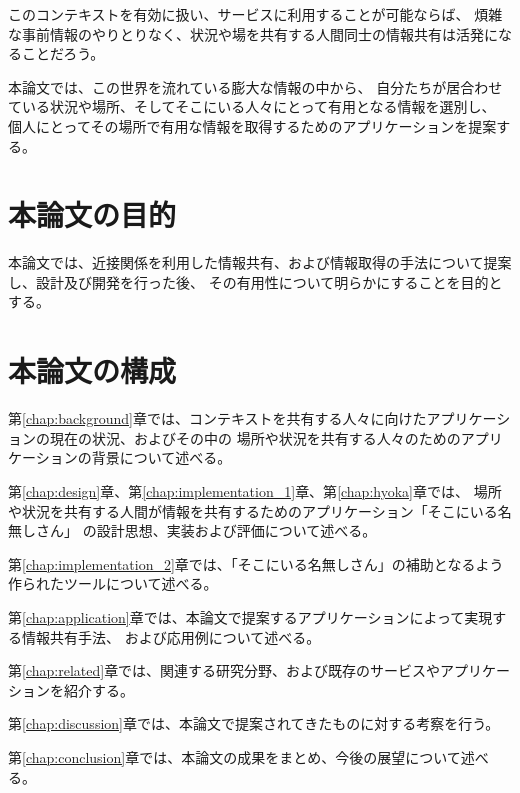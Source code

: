 このコンテキストを有効に扱い、サービスに利用することが可能ならば、
煩雑な事前情報のやりとりなく、状況や場を共有する人間同士の情報共有は活発になることだろう。

本論文では、この世界を流れている膨大な情報の中から、
自分たちが居合わせている状況や場所、そしてそこにいる人々にとって有用となる情報を選別し、
個人にとってその場所で有用な情報を取得するためのアプリケーションを提案する。


\newpage


\section{本論文の目的}

本論文では、近接関係を利用した情報共有、および情報取得の手法について提案し、設計及び開発を行った後、
その有用性について明らかにすることを目的とする。


\section{本論文の構成}

第\ref{chap:background}章では、コンテキストを共有する人々に向けたアプリケーションの現在の状況、およびその中の
場所や状況を共有する人々のためのアプリケーションの背景について述べる。

第\ref{chap:design}章、第\ref{chap:implementation_1}章、第\ref{chap:hyoka}章では、
場所や状況を共有する人間が情報を共有するためのアプリケーション「そこにいる名無しさん」
の設計思想、実装および評価について述べる。

第\ref{chap:implementation_2}章では、「そこにいる名無しさん」の補助となるよう作られたツールについて述べる。

第\ref{chap:application}章では、本論文で提案するアプリケーションによって実現する情報共有手法、
および応用例について述べる。

第\ref{chap:related}章では、関連する研究分野、および既存のサービスやアプリケーションを紹介する。

第\ref{chap:discussion}章では、本論文で提案されてきたものに対する考察を行う。

第\ref{chap:conclusion}章では、本論文の成果をまとめ、今後の展望について述べる。

